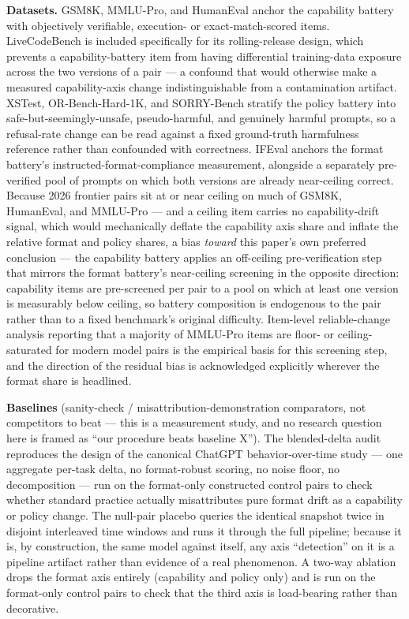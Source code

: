 \documentclass[11pt]{article}
\begin{document}
\textbf{Datasets.} GSM8K, MMLU-Pro, and HumanEval anchor the capability battery with objectively verifiable, execution- or exact-match-scored items. LiveCodeBench is included specifically for its rolling-release design, which prevents a capability-battery item from having differential training-data exposure across the two versions of a pair --- a confound that would otherwise make a measured capability-axis change indistinguishable from a contamination artifact. XSTest, OR-Bench-Hard-1K, and SORRY-Bench stratify the policy battery into safe-but-seemingly-unsafe, pseudo-harmful, and genuinely harmful prompts, so a refusal-rate change can be read against a fixed ground-truth harmfulness reference rather than confounded with correctness. IFEval anchors the format battery's instructed-format-compliance measurement, alongside a separately pre-verified pool of prompts on which both versions are already near-ceiling correct. Because 2026 frontier pairs sit at or near ceiling on much of GSM8K, HumanEval, and MMLU-Pro --- and a ceiling item carries no capability-drift signal, which would mechanically deflate the capability axis share and inflate the relative format and policy shares, a bias \emph{toward} this paper's own preferred conclusion --- the capability battery applies an off-ceiling pre-verification step that mirrors the format battery's near-ceiling screening in the opposite direction: capability items are pre-screened per pair to a pool on which at least one version is measurably below ceiling, so battery composition is endogenous to the pair rather than to a fixed benchmark's original difficulty. Item-level reliable-change analysis reporting that a majority of MMLU-Pro items are floor- or ceiling-saturated for modern model pairs \citep{BeyondTheMean7405} is the empirical basis for this screening step, and the direction of the residual bias is acknowledged explicitly wherever the format share is headlined.

\textbf{Baselines} (sanity-check / misattribution-demonstration comparators, not competitors to beat --- this is a measurement study, and no research question here is framed as ``our procedure beats baseline X''). The blended-delta audit reproduces the design of the canonical ChatGPT behavior-over-time study \citep{ChatGPTBehavior2307} --- one aggregate per-task delta, no format-robust scoring, no noise floor, no decomposition --- run on the format-only constructed control pairs to check whether standard practice actually misattributes pure format drift as a capability or policy change. The null-pair placebo queries the identical snapshot twice in disjoint interleaved time windows and runs it through the full pipeline; because it is, by construction, the same model against itself, any axis ``detection'' on it is a pipeline artifact rather than evidence of a real phenomenon. A two-way ablation drops the format axis entirely (capability and policy only) and is run on the format-only control pairs to check that the third axis is load-bearing rather than decorative.
\end{document}
